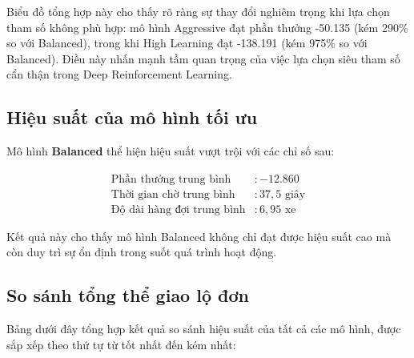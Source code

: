 Biểu đồ tổng hợp này cho thấy rõ ràng sự thay đổi nghiêm trọng khi lựa chọn tham số không phù hợp: mô hình Aggressive đạt phần thưởng -50.135 (kém 290\% so với Balanced), trong khi High Learning đạt -138.191 (kém 975\% so với Balanced). Điều này nhấn mạnh tầm quan trọng của việc lựa chọn siêu tham số cẩn thận trong Deep Reinforcement Learning.
\newpage
\subsection{Hiệu suất của mô hình tối ưu}

Mô hình \textbf{Balanced} thể hiện hiệu suất vượt trội với các chỉ số sau:

\begin{align}
    \text{Phần thưởng trung bình}     & : -12.860             \\
    \text{Thời gian chờ trung bình}   & : 37,5 \text{ giây} \\
    \text{Độ dài hàng đợi trung bình} & : 6,95 \text{ xe}
\end{align}

Kết quả này cho thấy mô hình Balanced không chỉ đạt được hiệu suất cao mà còn duy
trì sự ổn định trong suốt quá trình hoạt động.

\subsection{So sánh tổng thể giao lộ đơn}

Bảng dưới đây tổng hợp kết quả so sánh hiệu suất của tất cả các mô hình, được sắp
xếp theo thứ tự từ tốt nhất đến kém nhất:

